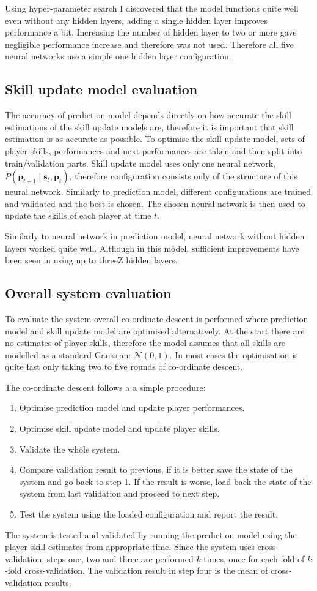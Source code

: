 \documentclass[12pt,a4paper]{book}
\newcommand\bs[1]{\boldsymbol{#1}}
\begin{document}
Using hyper-parameter search I discovered that the model functions quite well even without any hidden layers, adding a single hidden layer improves performance a bit.
Increasing the number of hidden layer to two or more gave negligible performance increase and therefore was not used.
Therefore all five neural networks use a simple one hidden layer configuration.
\subsection{Skill update model evaluation}
The accuracy of prediction model depends directly on how accurate the skill estimations of the skill update models are, therefore it is important that skill estimation is as accurate as possible.
To optimise the skill update model, sets of player skills, performances and next performances are taken and then split into train/validation parts.
Skill update model uses only one neural network, $P(\bs{p}_{t+1}\mid\bs{s}_t,\bs{p}_t)$, therefore configuration consists only of the structure of this neural network.
Similarly to prediction model, different configurations are trained and validated and the best is chosen.
The chosen neural network is then used to update the skills of each player at time $t$.

Similarly to neural network in prediction model, neural network without hidden layers worked quite well.
Although in this model, sufficient improvements have been seen in using up to threeZ hidden layers.

\subsection{Overall system evaluation}
To evaluate the system overall co-ordinate descent is performed where prediction model and skill update model are optimised alternatively.
At the start there are no estimates of player skills, therefore the model assumes that all skills are modelled as a standard Gaussian: $\mathcal{N}(0,1)$.
In most cases the optimisation is quite fast only taking two to five rounds of co-ordinate descent.

The co-ordinate descent follows a a simple procedure:
\begin{enumerate}
\item Optimise prediction model and update player performances.
\item Optimise skill update model and update player skills.
\item Validate the whole system.
\item Compare validation result to previous, if it is better save the state of the system and go back to step 1.
If the result is worse, load back the state of the system from last validation and proceed to next step.
\item Test the system using the loaded configuration and report the result.
\end{enumerate}
The system is tested and validated by running the prediction model using the player skill estimates from appropriate time.
Since the system uses cross-validation, steps one, two and three are performed $k$ times, once for each fold of $k$-fold cross-validation.
The validation result in step four is the mean of cross-validation results.
\end{document}
